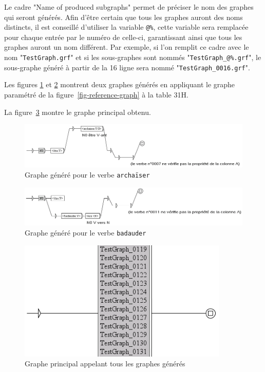 \bigskip
\noindent  Le cadre "Name of produced subgraphs" permet de préciser le nom des graphes qui seront
générés. Afin d’être certain que tous les graphes auront des noms distincts, il est conseillé
d’utiliser la variable \verb+@%+, cette variable sera remplacée pour chaque entrée par le numéro de
celle-ci, garantissant ainsi que tous les graphes auront un nom différent. Par exemple, si l’on
remplit ce cadre avec le nom "\verb+TestGraph.grf+" et si les sous-graphes sont nommés
"\verb+TestGraph_@%.grf+", le sous-graphe généré à partir de la 16{\ieme}    ligne sera nommé  
"\verb+TestGraph_0016.grf+".

\bigskip
\noindent Les figures \ref{fig-archaiser} et \ref{fig-badauder} montrent deux graphes générés
en appliquant le graphe paramétré de la figure~\ref{fig-reference-graph} à la table 31H.

\bigskip
\noindent La figure~\ref{fig-main-graph} montre le graphe principal obtenu.

\begin{figure}[!ht]
\begin{center}
\includegraphics[width=15cm]{resources/img/fig8-8.png}
\caption{Graphe généré pour le verbe
\texttt{archa\"iser}\label{fig-archaiser}}
\end{center}
\end{figure}

\begin{figure}[!ht]
\begin{center}
\includegraphics[width=15cm]{resources/img/fig8-9.png}
\caption{Graphe généré pour le verbe \texttt{badauder}\label{fig-badauder}}
\end{center}
\end{figure}

\begin{figure}[!ht]
\begin{center}
\includegraphics[width=10cm]{resources/img/fig8-10.png}
\caption{Graphe principal appelant tous les graphes générés\label{fig-main-graph}}
\end{center}
\end{figure}


